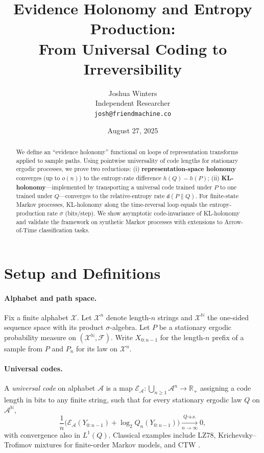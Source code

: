 \documentclass[11pt]{article}
\title{Evidence Holonomy and Entropy Production:\\
From Universal Coding to Irreversibility}
\author{Joshua Winters\\Independent Researcher\\\texttt{josh@friendmachine.co}}
\date{August 27, 2025}
\newcommand{\X}{\mathcal{X}}
\newcommand{\N}{\mathbb{N}}
\newcommand{\1}{\mathbbm{1}}
\newcommand{\code}{\mathcal{E}}
\newcommand{\RR}{\mathbb{R}}
\begin{document}
\maketitle

\begin{abstract}
We define an ``evidence holonomy'' functional on loops of representation transforms applied to sample paths. Using pointwise universality of code lengths for stationary ergodic processes, we prove two reductions: (i) \textbf{representation-space holonomy} converges (up to $o(n)$) to the entropy-rate difference $h(Q)-h(P)$; (ii) \textbf{KL-holonomy}—implemented by transporting a universal code trained under $P$ to one trained under $Q$—converges to the relative-entropy rate $\mathsf{d}(P\|Q)$. For finite-state Markov processes, KL-holonomy along the time-reversal loop equals the entropy-production rate $\sigma$ (bits/step). We show asymptotic code-invariance of KL-holonomy and validate the framework on synthetic Markov processes with extensions to Arrow-of-Time classification tasks.
\end{abstract}

\section{Setup and Definitions}

\paragraph{Alphabet and path space.} Fix a finite alphabet $\X$. Let $\X^n$ denote length-$n$ strings and $\X^{\N}$ the one-sided sequence space with its product $\sigma$-algebra. Let $P$ be a stationary ergodic probability measure on $(\X^{\N},\mathcal{F})$. Write $X_{0:n-1}$ for the length-$n$ prefix of a sample from $P$ and $P_n$ for its law on $\X^n$.

\paragraph{Universal codes.}
A \emph{universal code} on alphabet $\mathcal{A}$ is a map $\code_{\mathcal{A}}:\bigcup_{n\ge 1}\mathcal{A}^n\to \RR_+$ assigning a code length in bits to any finite string, such that for every stationary ergodic law $Q$ on $\mathcal{A}^{\N}$,
\begin{equation}\label{eq:universality}
\frac{1}{n}\Big(\code_{\mathcal{A}}(Y_{0:n-1}) + \log_2 Q_n(Y_{0:n-1})\Big) \xrightarrow[n\to\infty]{Q\text{-a.s.}} 0,
\end{equation}
with convergence also in $L^1(Q)$. Classical examples include LZ78, Krichevsky--Trofimov mixtures for finite-order Markov models, and CTW \cite{ziv1978,kt1981,willems1995ctw,shields1996,csiszarshields2004}.
\end{document}
